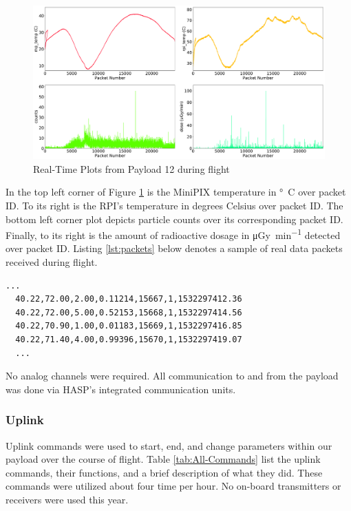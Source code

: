 \begin{figure}[H]
	\begin{center}
	\includegraphics[width=\textwidth]{figures/2018EnvironmentalPlots.pdf}
	\caption{Real-Time Plots from Payload 12 during flight}
	\label{fig:rtp}
	\end{center}
\end{figure}

In the top left corner of Figure \ref{fig:rtp} is the MiniPIX temperature in \si{\degree C} over packet ID. 
To its right is the RPI's temperature in degrees Celsius over packet ID. 
The bottom left corner plot depicts particle counts over its corresponding packet ID. 
Finally, to its right is the amount of radioactive dosage in \si{\micro\gray\per\minute} detected over packet ID.
Listing \ref{lst:packets} below denotes a sample of real data packets received during flight. 

\bigskip
\lstset{basicstyle=\small, numbers=left, xleftmargin=2em, frame=tb, label = Downlinks, framexleftmargin=1.5em}
\begin{lstlisting}[caption = Sample of downlinked data packets ID: 15667 - 15670, label={lst:packets}]
  ...
  40.22,72.00,2.00,0.11214,15667,1,1532297412.36
  40.22,72.00,5.00,0.52153,15668,1,1532297414.56
  40.22,70.90,1.00,0.01183,15669,1,1532297416.85
  40.22,71.40,4.00,0.99396,15670,1,1532297419.07
  ...
\end{lstlisting}

No analog channels were required. All communication to and from the payload was done via HASP's integrated communication 
units.

\subsubsection{Uplink}
\label{sec:Uplink} 
Uplink commands were used to start, end, and change parameters within our payload over the course of flight. 
Table \ref{tab:All-Commands} list the uplink commands, their functions, and a brief description of what they did. 
These commands were utilized about four time per hour. No on-board transmitters or receivers were used this year.


